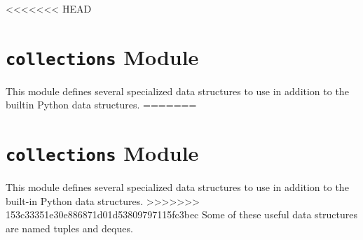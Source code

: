<<<<<<< HEAD


\section*{\texttt{collections} Module}
This module defines several specialized data structures to use in addition to the builtin Python data structures.
=======
\section*{\texttt{collections} Module}
This module defines several specialized data structures to use in addition to the built-in Python data structures.
>>>>>>> 153c33351e30e886871d01d53809797115fc3bec
Some of these useful data structures are named tuples and deques.

